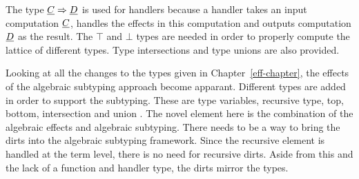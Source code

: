 The type $\underline{C} \Rightarrow \underline{D}$ is used for handlers because a handler takes an input computation $\underline{C}$, handles the effects in this computation and outputs computation $\underline{D}$ as the result. \cite{handling} The $\top$ and $\bot$ types are needed in order to properly compute the lattice of different types. Type intersections and type unions are also provided. \cite{mlsub}

Looking at all the changes to the types given in Chapter~\ref{eff-chapter}, the effects of the algebraic subtyping approach become apparant. Different types are added in order to support the subtyping. These are type variables, recursive type, top, bottom, intersection and union \cite{mlsub}. The novel element here is the combination of the algebraic effects and algebraic subtyping. There needs to be a way to bring the dirts into the algebraic subtyping framework. Since the recursive element is handled at the term level, there is no need for recursive dirts. Aside from this and the lack of a function and handler type, the dirts mirror the types.

